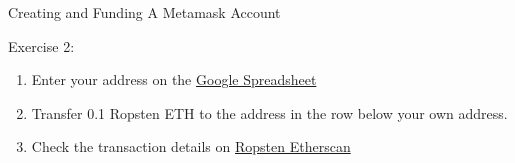 \documentclass[handout]{beamer}
\begin{document}
\begin{frame}{Creating and Funding A Metamask Account}

	\begin{exercise}{Exercise 2:}
		\begin{enumerate}
			\item Enter your address on the \link \href{(https://goo.gl/3B83Sq)}{Google Spreadsheet}
			\item Transfer 0.1 Ropsten ETH to the address in the row below your own address.
			\item Check the transaction details on \link \href{https://ropsten.etherscan.io/}{Ropsten Etherscan}
		\end{enumerate}
	\end{exercise}	
\end{frame}
\end{document}
